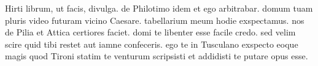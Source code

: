 


 Hirti librum, ut facis, divulga. de Philotimo idem et ego arbitrabar. domum tuam pluris video futuram vicino Caesare. tabellarium meum hodie exspectamus. nos de Pilia et Attica certiores faciet. domi te libenter esse facile credo. sed velim scire quid tibi restet aut iamne confeceris. ego te in Tusculano exspecto eoque magis quod Tironi statim te venturum scripsisti et addidisti te putare opus esse.
